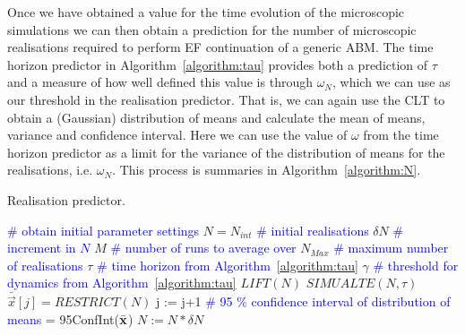 \documentclass[11pt]{article}
\begin{document}
Once we have obtained a value for the time evolution of the microscopic simulations we can then obtain a prediction for the number of microscopic realisations required to perform EF continuation of a generic ABM. The time horizon predictor in Algorithm~\ref{algorithm:tau} provides both a prediction of $\tau$ and a measure of how well defined this value is through $\omega_N$, which we can use as our threshold in the realisation predictor. That is, we can again use the CLT to obtain a (Gaussian) distribution of means and calculate the mean of means, variance and confidence interval. Here we can use the value of $\omega$ from the time horizon predictor as a limit for the variance of the distribution of means for the realisations, i.e. $\omega_{N}$. This process is summaries in Algorithm~\ref{algorithm:N}.  

\begin{algorithm}[h!]
	\caption{Realisation predictor. \label{algorithm:N}}
	\begin{algorithmic}
		\State \textcolor{blue}{\# obtain initial parameter settings}
		\State $N=N_{int}$ \textcolor{blue}{\# initial realisations}
		\State $\delta N$ \textcolor{blue}{\# increment in $N$}
		\State $M$ \textcolor{blue}{\# number of runs to average over}
		\State $N_{Max}$ \textcolor{blue}{\# maximum number of realisations}
		\State $\tau$ \textcolor{blue}{\# time horizon from Algorithm~\ref{algorithm:tau}}
		\State $\gamma$ \textcolor{blue}{\# threshold for dynamics from Algorithm~\ref{algorithm:tau}}
				\State $LIFT(N)$
				\State $SIMUALTE(N,\tau)$
				\State $\bar{\vec{x}}[j] = RESTRICT(N)$
				\State j := j+1
			\EndFor
			\State \textcolor{blue}{\# 95 \% confidence interval of distribution of means}
			 = 95ConfInt({$\bar{\bf x}$})
			\State $N := N * \delta N$
		\EndWhile
\end{algorithmic}
\end{algorithm}
\end{document}
